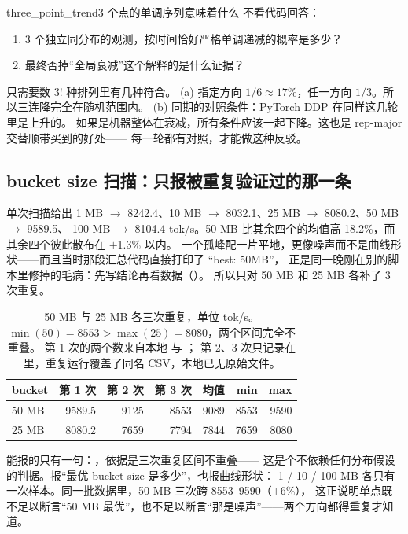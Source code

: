 \begin{checkpoint}{three_point_trend}{3 个点的单调序列意味着什么}
不看代码回答：
\begin{enumerate}[label=(\alph*)]
  \item 3 个独立同分布的观测，按时间恰好严格单调递减的概率是多少？
  \item 最终否掉“全局衰减”这个解释的是什么证据？
\end{enumerate}
\hint 只需要数 $3!$ 种排列里有几种符合。
\ifshowanswers
\tcblower
\answer (a) 指定方向 $1/6 \approx 17\%$，任一方向 $1/3$。所以三连降完全在随机范围内。
(b) 同期的对照条件：PyTorch DDP 在同样这几轮里是上升的。
如果是机器整体在衰减，所有条件应该一起下降。这也是 rep-major 交替顺带买到的好处——
每一轮都有对照，才能做这种反驳。
\whereincode {}
\fi
\end{checkpoint}

\subsection{bucket size 扫描：只报被重复验证过的那一条}
\label{subsec:bucket-sweep}

单次扫描给出 1 MB $\to$ 8242.4、10 MB $\to$ 8032.1、25 MB $\to$ 8080.2、50 MB $\to$ 9589.5、
100 MB $\to$ 8104.4 tok/s。50 MB 比其余四个的均值高 18.2\%，而其余四个彼此散布在 $\pm$1.3\% 以内。
一个孤峰配一片平地，更像噪声而不是曲线形状——而且当时那段汇总代码直接打印了 “best: 50MB”，
正是同一晚刚在别的脚本里修掉的毛病：先写结论再看数据（）。
所以只对 50 MB 和 25 MB 各补了 3 次重复。

\begin{table}[h]
\centering\small
\begin{tabular}{lrrrrrr}
\toprule
bucket & 第 1 次 & 第 2 次 & 第 3 次 & 均值 & min & max \\
\midrule
50 MB & 9589.5 & 9125 & 8553 & 9089 & 8553 & 9590 \\
25 MB & 8080.2 & 7659 & 7794 & 7844 & 7659 & 8080 \\
\bottomrule
\end{tabular}
\caption{50 MB 与 25 MB 各三次重复，单位 tok/s。$\min(50) = 8553 > \max(25) = 8080$，两个区间完全不重叠。
第 1 次的两个数来自本地  与 ；
第 2、3 次只记录在  里，重复运行覆盖了同名 CSV，本地已无原始文件。}
\end{table}

能报的只有一句：，依据是三次重复区间不重叠——
这是个不依赖任何分布假设的判据。报“最优 bucket size 是多少”，也报曲线形状：
1 / 10 / 100 MB 各只有一次样本。同一批数据里，50 MB 三次跨 8553--9590（$\pm$6\%），
这正说明单点既不足以断言“50 MB 最优”，也不足以断言“那是噪声”——两个方向都得重复才知道。

